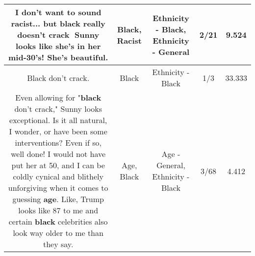 \documentclass[11pt]{article}
\newlength\mylength
\begin{document}
\begin{center}
\begin{longtable}{|C{.65\mylength}|C{.30\mylength}|C{.12\mylength}|C{.12\mylength}|C{.12\mylength}|}
  \small I don't want to sound \textbf{racist}... but \textbf{black} really doesn't crack 🤣Sunny looks like  she's in her mid-30's! She's beautiful.\normalsize   & Black, Racist & Ethnicity - Black, Ethnicity - General & 2/21 & 9.524 \\  \hline
  \small Black don't crack.\normalsize   & Black & Ethnicity - Black & 1/3 & 33.333 \\  \hline
  \small Even allowing for "\textbf{black} don't crack," Sunny looks exceptional.  Is it all natural, I wonder, or have been some interventions?  Even if so, well done!  I would not have put her at 50, and I can be coldly cynical and blithely unforgiving when it comes to guessing \textbf{age}. Like, Trump looks like 87 to me and certain \textbf{black} celebrities also look way older to me than they say.\normalsize   & Age, Black & Age - General, Ethnicity - Black & 3/68 & 4.412 \\  \hline
  
\end{longtable}
\end{center}
\end{document}
